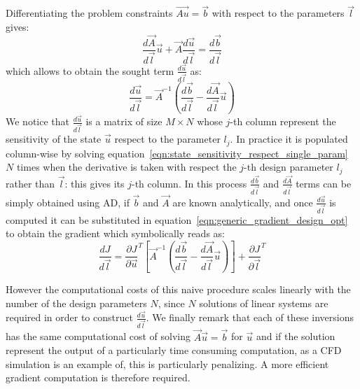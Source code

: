 Differentiating the problem constraints $\vec{Au} = \vec{b}$ with respect to the parameters $\vec{l}$ gives:
\begin{equation}
	\frac{d\vec{A}}{d\vec{l}} \vec{u} + \vec{A} \frac{d\vec{u}}{d\vec{l}} = \frac{d\vec{b}}{d\vec{l}}
\end{equation}
which allows to obtain the sought term $\frac{d\vec{u}}{d\vec{l}}$ as:
\begin{equation}
	\label{eqn:state_sensitivity_respect_single_param}
	\frac{d\vec{u}}{d\vec{l}} = \vec{A}^{-1} \left( \frac{d\vec{b}}{d\vec{l}} - \frac{d\vec{A}}{d\vec{l}}\vec{u} \right)
\end{equation}
We notice that $\frac{d\vec{u}}{d\vec{l}}$ is a matrix of size $M \times N$ whose $j$-th column represent the sensitivity of the state $\vec{u}$ respect to the parameter $l_j$. 
In practice it is populated column-wise by solving equation~\eqref{eqn:state_sensitivity_respect_single_param} $N$ times when the derivative is taken with respect the $j$-th design parameter $l_j$ rather than $\vec{l}$: this gives its $j$-th column. In this process $\frac{d\vec{b}}{d\vec{l}}$ and $\frac{d\vec{A}}{d\vec{l}}$ terms can be simply obtained using AD, if $\vec{b}$ and $\vec{A}$ are known analytically, and once $\frac{d\vec{u}}{d\vec{l}}$ is computed it can be substituted in equation~\eqref{eqn:generic_gradient_design_opt} to obtain the gradient which symbolically reads as:
\begin{equation}
	\label{eqn:generic_gradient_design_opt_naive}
	\frac{dJ}{d\vec{l}} = \frac{\partial J}{\partial \vec{u}}^T \left[ \vec{A}^{-1} \left( \frac{d\vec{b}}{d\vec{l}} - \frac{d\vec{A}}{d\vec{l}}\vec{u} \right) \right]  + \frac{\partial J}{\partial \vec{l}}^T
\end{equation}

However the computational costs of this naive procedure scales linearly with the number of the design parameters $N$, since $N$ solutions of linear systems are required in order to construct $\frac{d\vec{u}}{d\vec{l}}$. We finally remark that each of these inversions has the same computational cost of solving $\vec{A} \vec{u}= \vec{b}$ for $\vec{u}$ and if the solution represent the output of a particularly time consuming computation, as a CFD simulation is an example of, this is particularly penalizing. A more efficient gradient computation is therefore required.

